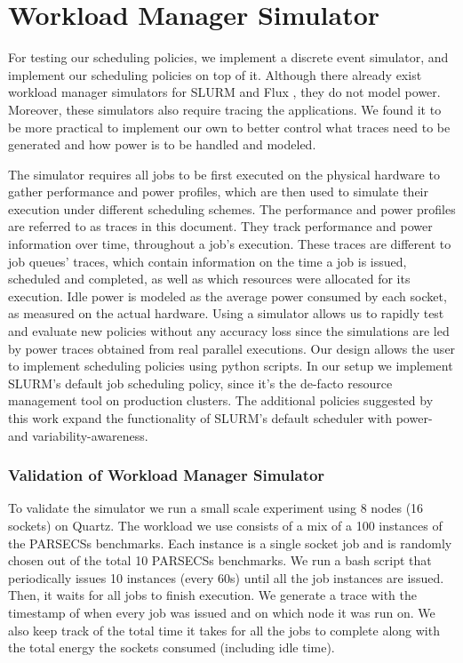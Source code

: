 \section{Workload Manager Simulator}
\label{sec:simulator}
For testing our scheduling policies, we implement a discrete event simulator, and
implement our scheduling policies on top of it.  Although there already exist workload
manager simulators for SLURM \cite{slurm_sim} and Flux \cite{flux_sim}, they do not model
power.  Moreover, these simulators also require tracing the applications.  We found it to
be more practical to implement our own to better control what traces need to be generated
and how power is to be handled and modeled. 

The simulator  requires all jobs to be first executed on the physical hardware
to gather performance and power profiles,  which are then used to simulate
their execution under different scheduling schemes. The performance and power
profiles are referred to as traces in this document.  They track performance
and power information over time, throughout a job's execution.  These traces
are different to job queues' traces, which contain information on the time a
job is issued, scheduled and completed, as well as which resources were
allocated for its execution.  Idle power is modeled as the average power consumed by each
socket, as measured on the actual hardware.  Using a simulator allows us to
rapidly test and evaluate new policies without any accuracy loss since the
simulations are led by power traces obtained from real parallel executions.
Our design allows the user to implement scheduling policies using python
scripts.  In our setup we implement SLURM's \cite{slurm_02} default job
scheduling policy, since it's the de-facto resource management tool on
production clusters.  The additional policies suggested by this work expand the
functionality of SLURM's default scheduler with power- and
variability-awareness.

\subsubsection{Validation of Workload Manager Simulator}
To validate the simulator we run a small scale experiment using 8 nodes (16
sockets) on Quartz.  The workload we use consists of a mix of a 100 instances
of the PARSECSs benchmarks.  Each instance is a single socket job and is
randomly chosen out of the total 10 PARSECSs benchmarks.  We run a bash script
that periodically issues 10 instances (every 60s) until all the job instances
are issued.  Then, it waits for all jobs to finish execution.  We generate a
trace with the timestamp of when every job was issued and on which node it was
run on.  We also keep track of the total time it takes for all the jobs to
complete along with the total energy the sockets consumed (including idle time).        

